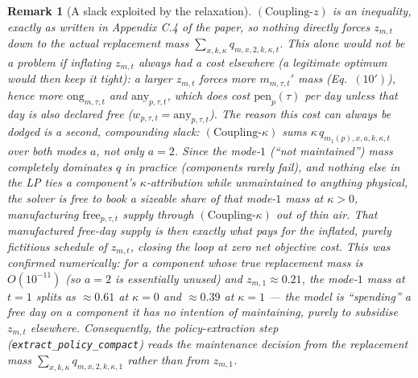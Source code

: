 \documentclass[11pt]{article}
\newtheorem{remark}{Remark}
\newcommand{\any}{\mathrm{any}}
\newcommand{\free}{\mathrm{free}}
\newcommand{\ong}{\mathrm{ong}}
\begin{document}
\begin{remark}[A slack exploited by the relaxation]
\label{rem:slack}
$(\mathrm{Coupling}\text{-}z)$ is an \emph{inequality}, exactly as written in Appendix C.4
of the paper, so nothing directly forces $z_{m,t}$ down to the actual replacement mass
$\sum_{x,k,\kappa} q_{m,x,2,k,\kappa,t}$. This alone would not be a problem if inflating
$z_{m,t}$ always had a cost elsewhere (a legitimate optimum would then keep it tight): a
larger $z_{m,t}$ forces more $m_{m,\tau,t}'$ mass (Eq.~$(10')$), hence more
$\ong_{m,\tau,t}$ and $\any_{p,\tau,t}$, which \emph{does} cost $\mathrm{pen}_p(\tau)$
per day \emph{unless} that day is also declared free ($w_{p,\tau,t}=\any_{p,\tau,t}$).
The reason this cost can always be dodged is a second, compounding slack:
$(\mathrm{Coupling}\text{-}\kappa)$ sums $\kappa \, q_{m_1(p),x,a,k,\kappa,t}$ over
\emph{both} modes $a$, not only $a=2$. Since the mode-$1$ (``not maintained'') mass
completely dominates $q$ in practice (components rarely fail), and nothing else in the
LP ties a component's $\kappa$-attribution while unmaintained to anything physical, the
solver is free to book a sizeable share of that mode-$1$ mass at $\kappa > 0$, manufacturing
$\free_{p,\tau,t}$ supply through $(\mathrm{Coupling}\text{-}\kappa)$ out of thin air. That
manufactured free-day supply is then exactly what pays for the inflated, purely fictitious
schedule of $z_{m,t}$, closing the loop at zero net objective cost. This was confirmed
numerically: for a component whose true replacement mass is $O(10^{-11})$ (so $a=2$ is
essentially unused) and $z_{m,1} \approx 0.21$, the mode-$1$ mass at $t=1$ splits as
$\approx 0.61$ at $\kappa=0$ and $\approx 0.39$ at $\kappa=1$ --- the model is ``spending''
a free day on a component it has no intention of maintaining, purely to subsidise
$z_{m,t}$ elsewhere. Consequently, the policy-extraction step
(\texttt{extract\_policy\_compact}) reads the maintenance decision from the replacement
mass $\sum_{x,k,\kappa} q_{m,x,2,k,\kappa,1}$ rather than from $z_{m,1}$.
\end{remark}
\end{document}
